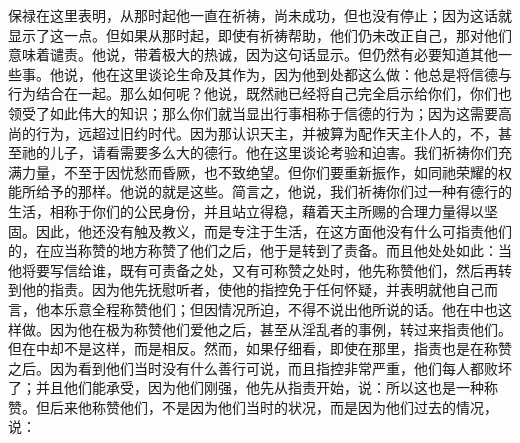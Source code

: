 保禄在这里表明，从那时起他一直在祈祷，尚未成功，但也没有停止；因为这话就显示了这一点。但如果从那时起，即使有祈祷帮助，他们仍未改正自己，那对他们意味着谴责。他说，带着极大的热诚，因为这句话显示。但仍然有必要知道其他一些事。他说，他在这里谈论生命及其作为，因为他到处都这么做：他总是将信德与行为结合在一起。那么如何呢？他说，既然祂已经将自己完全启示给你们，你们也领受了如此伟大的知识；那么你们就当显出行事相称于信德的行为；因为这需要高尚的行为，远超过旧约时代。因为那认识天主，并被算为配作天主仆人的，不，甚至祂的儿子，请看需要多么大的德行。他在这里谈论考验和迫害。我们祈祷你们充满力量，不至于因忧愁而昏厥，也不致绝望。但你们要重新振作，如同祂荣耀的权能所给予的那样。他说的就是这些。简言之，他说，我们祈祷你们过一种有德行的生活，相称于你们的公民身份，并且站立得稳，藉着天主所赐的合理力量得以坚固。因此，他还没有触及教义，而是专注于生活，在这方面他没有什么可指责他们的，在应当称赞的地方称赞了他们之后，他于是转到了责备。而且他处处如此：当他将要写信给谁，既有可责备之处，又有可称赞之处时，他先称赞他们，然后再转到他的指责。因为他先抚慰听者，使他的指控免于任何怀疑，并表明就他自己而言，他本乐意全程称赞他们；但因情况所迫，不得不说出他所说的话。他在中也这样做。因为他在极为称赞他们爱他之后，甚至从淫乱者的事例，转过来指责他们。但在中却不是这样，而是相反。然而，如果仔细看，即使在那里，指责也是在称赞之后。因为看到他们当时没有什么善行可说，而且指控非常严重，他们每人都败坏了；并且他们能承受，因为他们刚强，他先从指责开始，说：所以这也是一种称赞。但后来他称赞他们，不是因为他们当时的状况，而是因为他们过去的情况，说：\par

